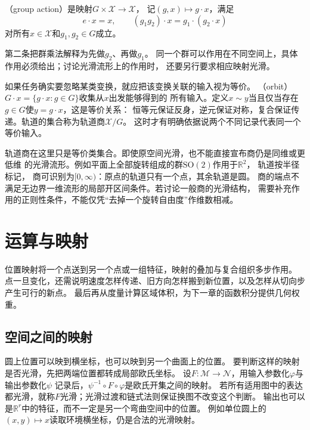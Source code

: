 \begin{definition}[群作用]
\label{def:geometry-group-action}
（group action）是映射$G\times\mathcal X\to\mathcal X$，
记$(g,x)\mapsto g\cdot x$，满足
\begin{equation}
 e\cdot x=x,\qquad (g_1g_2)\cdot x=g_1\cdot(g_2\cdot x)
 \label{eq:geometry-group-action}
\end{equation}
对所有$x\in\mathcal X$和$g_1,g_2\in G$成立。
\end{definition}
第二条把群乘法解释为先做$g_2$、再做$g_1$。
同一个群可以作用在不同空间上，具体作用必须给出；讨论光滑流形上的作用时，
还要另行要求相应映射光滑。


如果任务确实要忽略某类变换，就应把该变换关联的输入视为等价。
（orbit）$G\cdot x=\{g\cdot x:g\in G\}$收集从$x$出发能够得到的
所有输入。定义$x\sim y$当且仅当存在$g\in G$使$y=g\cdot x$，这是等价关系：
恒等元保证反身，逆元保证对称，复合保证传递。轨道的集合称为轨道商$\mathcal X/G$。
这时才有明确依据说两个不同记录代表同一个等价输入。


轨道商在这里只是等价类集合。即使原空间光滑，也不能直接宣布商仍是同维或更低维
的光滑流形。例如平面上全部旋转组成的群$\mathrm{SO}(2)$作用于$\mathbb R^2$，
轨道按半径标记，
商可识别为$[0,\infty)$：原点的轨道只有一个点，其余轨道是圆。
商的端点不满足无边界一维流形的局部开区间条件。若讨论一般商的光滑结构，
需要补充作用的正则性条件，不能仅凭“去掉一个旋转自由度”作维数相减。

\section{运算与映射}
\label{sec:geometry-operations}

位置映射将一个点送到另一个点或一组特征，映射的叠加与复合组织多步作用。
点一旦变化，还需说明速度怎样传递、旧方向怎样搬到新位置，以及怎样从切向步产生可行的新点。
最后再从度量计算区域体积，为下一章的函数积分提供几何权重。

\subsection{空间之间的映射}
\label{sec:geometry-point-maps}

圆上位置可以映到横坐标，也可以映到另一个曲面上的位置。
要判断这样的映射是否光滑，先把两端位置都转成局部欧氏坐标。
设$F:\mathcal M\to\mathcal N$，用输入参数化$\varphi$与输出参数化$\psi$
记录后，$\psi^{-1}\circ F\circ\varphi$是欧氏开集之间的映射。
若所有适用图中的表达都光滑，就称$F$光滑；光滑过渡和链式法则保证换图不改变这个判断。
输出也可以是$\mathbb R^r$中的特征，而不一定是另一个弯曲空间中的位置。
例如单位圆上的$(x,y)\mapsto x$读取环境横坐标，仍是合法的光滑映射。

